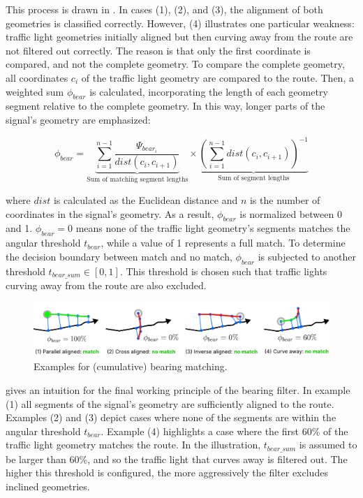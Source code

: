 This process is drawn in . In cases (1), (2), and (3), the alignment of both geometries is classified correctly. However, (4) illustrates one particular weakness: traffic light geometries initially aligned but then curving away from the route are not filtered out correctly. The reason is that only the first coordinate is compared, and not the complete geometry. To compare the complete geometry, all coordinates $c_i$ of the traffic light geometry are compared to the route. Then, a weighted sum $\phi_{bear}$ is calculated, incorporating the length of each geometry segment relative to the complete geometry. In this way, longer parts of the signal's geometry are emphasized:

\begin{equation} 
\phi_{bear} = 
    \underbrace{\sum_{i=1}^{n-1} 
    \frac{\Psi_{bear_i}}{dist(c_i, c_{i+1})}}_{\text{Sum of matching segment lengths}}
    \times
    \underbrace{(\sum_{i=1}^{n-1} dist(c_i, c_{i+1}))^{-1}}_{\text{Sum of segment lengths}}
\end{equation}

where $dist$ is calculated as the Euclidean distance and $n$ is the number of coordinates in the signal's geometry. As a result, $\phi_{bear}$ is normalized between 0 and 1. $\phi_{bear} = 0$ means none of the traffic light geometry's segments matches the angular threshold $t_{bear}$, while a value of 1 represents a full match. To determine the decision boundary between match and no match, $\phi_{bear}$ is subjected to another threshold $t_{bear\_sum} \in [0, 1]$. This threshold is chosen such that traffic lights curving away from the route are also excluded.

\begin{figure}[b]
\centering
\includegraphics[width=\linewidth]{images/sg-selection-bearing-filter-sum.pdf}
\caption{Examples for (cumulative) bearing matching.}
\label{fig:sg-selection-bearing-filter-sum}
\end{figure}

 gives an intuition for the final working principle of the bearing filter. In example (1) all segments of the signal's geometry are sufficiently aligned to the route. Examples (2) and (3) depict cases where none of the segments are within the angular threshold $t_{bear}$. Example (4) highlights a case where the first 60\% of the traffic light geometry matches the route. In the illustration, $t_{bear\_sum}$ is assumed to be larger than 60\%, and so the traffic light that curves away is filtered out. The higher this threshold is configured, the more aggressively the filter excludes inclined geometries.

